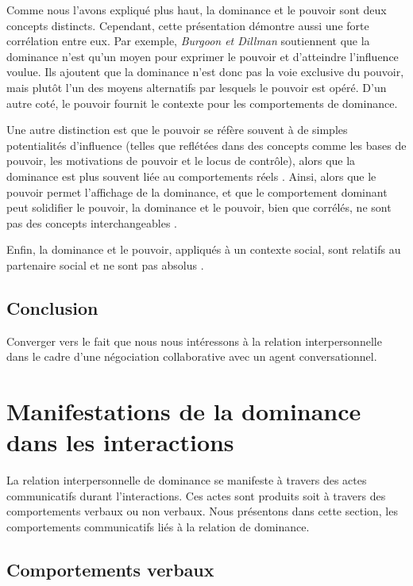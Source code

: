 		Comme nous l'avons expliqué plus haut, la dominance et le pouvoir sont deux concepts distincts. Cependant, cette présentation démontre aussi une forte corrélation entre eux. 
		Par exemple, \emph{Burgoon et Dillman} \cite{burgoon1995interpersonal} soutiennent que la dominance n'est qu'un moyen pour exprimer le pouvoir et d'atteindre l'influence voulue.
		Ils ajoutent que la dominance n'est donc pas la voie exclusive du pouvoir, mais plutôt l'un des moyens alternatifs par lesquels le pouvoir est opéré. D'un autre coté, le pouvoir fournit le contexte pour les comportements de dominance. %
		
		Une autre distinction est que le pouvoir se réfère souvent à de simples potentialités d'influence (telles que reflétées dans des concepts comme les bases de pouvoir, les motivations de pouvoir et le locus de contrôle),
		alors que la dominance est plus souvent liée au comportements réels \cite{dunbar2005perceptions,burgoon1998nature}. 
		Ainsi, alors que le pouvoir permet l'affichage de la dominance, et que le comportement dominant peut solidifier le pouvoir, la dominance et le pouvoir, bien que corrélés, ne sont pas des concepts interchangeables \cite{burgoon1995interpersonal}.
		
		Enfin, la dominance et le pouvoir, appliqués à un contexte social, sont relatifs au partenaire social et ne sont pas absolus \cite{dunbar2005perceptions}.
		
	\subsection{Conclusion}
		Converger vers le fait que nous nous intéressons à la relation interpersonnelle dans le cadre d'une négociation collaborative avec un agent conversationnel.
	\section{Manifestations de la dominance dans les interactions}
		La relation interpersonnelle de dominance se manifeste à travers des actes communicatifs durant l'interactions. Ces actes sont produits soit à travers des comportements verbaux ou non verbaux.
		Nous présentons dans cette section, les comportements communicatifs liés à la relation de dominance. 
		\subsection{Comportements verbaux}
		
